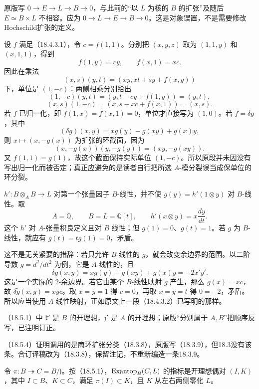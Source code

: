 原版写 $0\to E\to L\to B\to0$，与此前的“以 $L$ 为核的 $B$ 的扩张”及随后 $E\simeq B\times L$ 不相容。应为 $0\to L\to E\to B\to0$。这是对象误置，不是需要修改Hochschild扩张的定义。

设 $f$ 满足（18.4.3.1），令 $c=f(1,1)$。分别把 $(x,y,z)$ 取为 $(1,1,y)$ 和 $(x,1,1)$，得到
\[
 f(1,y)=cy,\qquad f(x,1)=xc.
\]
因此在乘法
\[
 (x,s)(y,t)=(xy,xt+sy+f(x,y))
\]
下，单位是 $(1,-c)$：两侧相乘分别给出
\[
 (1,-c)(y,t)=(y,t-cy+f(1,y))=(y,t),
\]
\[
 (x,s)(1,-c)=(x,s-xc+f(x,1))=(x,s).
\]
若 $f$ 已归一化，即 $f(1,x)=f(x,1)=0$，单位才直接写为 $(1,0)$。若 $f=\delta g$，其中
\[
 (\delta g)(x,y)=xg(y)-g(xy)+g(x)y,
\]
则 $x\mapsto(x,-g(x))$ 为扩张的环截面，因为
\[
 (x,-g(x))(y,-g(y))=(xy,-g(xy)).
\]
又 $f(1,1)=g(1)$，故这个截面保持实际单位 $(1,-c)$。所以原段并未因没有写出归一化而被否定；真正应避免的是读者自行把所选 $A$-模分裂误当成保单位的环分裂。

$h':B\otimes_AB\to L$ 对第一个张量因子 $B$-线性，并不使 $g(y)=h'(1\otimes y)$ 对 $B$-线性。取
\[
 A=\mathbb Q,
 \qquad B=L=\mathbb Q[t],
 \qquad h'(x\otimes y)=x\frac{dy}{dt}.
\]
这个 $h'$ 对 $A$-张量积良定义且对 $B$ 线性；但 $g(1)=0$、$g(t)=1$。若 $g$ 为 $B$-线性，就应有 $g(t)=tg(1)=0$，矛盾。

这不是无关紧要的措辞：若只允许 $B$-线性的 $g$，就会改变余边界的范围。以二阶导数 $g=d^2/dt^2$ 为例，它是 $A$-线性的，且
\[
 \delta g(x,y)=xg(y)-g(xy)+g(x)y=-2x'y'.
\]
这是一个实际的 $2$-余边界。若它由某个 $B$-线性映射 $\widetilde g$ 产生，那么 $\widetilde g(x)=x c$，故 $\delta\widetilde g(x,y)=xyc$。取 $x=y=1$ 得 $c=0$，再取 $x=y=t$ 得 $0=-2$，矛盾。所以应当使用 $A$-线性映射，正如原文上一段（18.4.3.2）已写明的那样。

（18.5.1）中 $\mathfrak k'$ 是 $B$ 的开理想，$\mathfrak j'$ 是 $A$ 的开理想；原版“分别属于 $A,B$”把顺序反写，已注明订正。

（18.5.4）证明调用的是商环扩张分类（18.3.8），原版写（18.3.9），但18.3没有该条。合订译稿改为（18.3.8），保留注记，不重新编造一条18.3.9。

令 $\pi:B\twoheadrightarrow C=B/\mathfrak j$。按（18.5.1），$\operatorname{Exantop}_B(C,L)$ 的指标是开理想偶对 $(I,K)$，其中 $I\subset B$、$K\subset C$，满足 $\pi(I)\subset K$，且 $K$ 从左右两侧零化 $L$。

